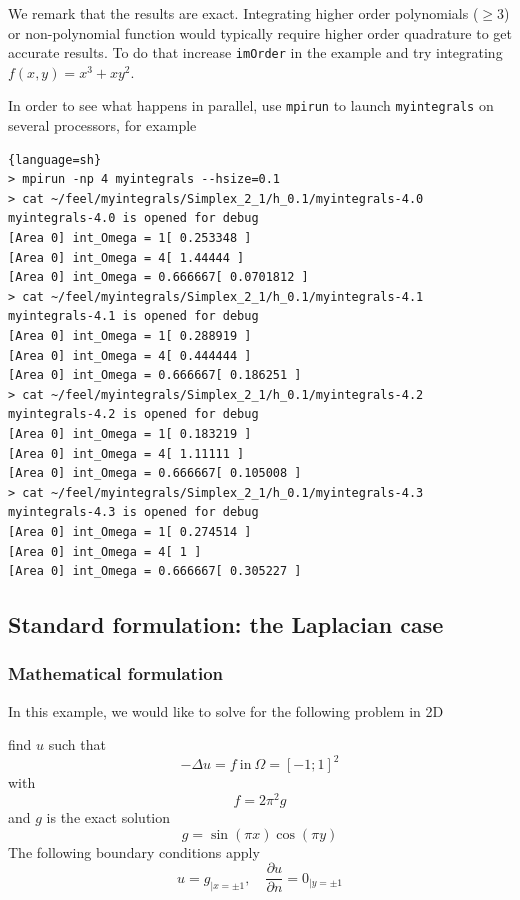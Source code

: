 We remark that the results are exact. Integrating higher order
polynomials ($\geq 3$) or non-polynomial function would typically
require higher order quadrature to get accurate results. To do that
increase \lstinline!imOrder! in the example and try integrating
$f(x,y)=x^3 + x y^2$.


In order to see what happens in parallel, use \lstinline!mpirun! to
launch \lstinline!myintegrals! on several processors, for example

\begin{lstlisting}{language=sh}
> mpirun -np 4 myintegrals --hsize=0.1
> cat ~/feel/myintegrals/Simplex_2_1/h_0.1/myintegrals-4.0
myintegrals-4.0 is opened for debug
[Area 0] int_Omega = 1[ 0.253348 ]
[Area 0] int_Omega = 4[ 1.44444 ]
[Area 0] int_Omega = 0.666667[ 0.0701812 ]
> cat ~/feel/myintegrals/Simplex_2_1/h_0.1/myintegrals-4.1
myintegrals-4.1 is opened for debug
[Area 0] int_Omega = 1[ 0.288919 ]
[Area 0] int_Omega = 4[ 0.444444 ]
[Area 0] int_Omega = 0.666667[ 0.186251 ]
> cat ~/feel/myintegrals/Simplex_2_1/h_0.1/myintegrals-4.2
myintegrals-4.2 is opened for debug
[Area 0] int_Omega = 1[ 0.183219 ]
[Area 0] int_Omega = 4[ 1.11111 ]
[Area 0] int_Omega = 0.666667[ 0.105008 ]
> cat ~/feel/myintegrals/Simplex_2_1/h_0.1/myintegrals-4.3
myintegrals-4.3 is opened for debug
[Area 0] int_Omega = 1[ 0.274514 ]
[Area 0] int_Omega = 4[ 1 ]
[Area 0] int_Omega = 0.666667[ 0.305227 ]
\end{lstlisting}

\subsection{Standard formulation: the Laplacian case}
\label{sec:defin-bilin-forms}
\subsubsection{Mathematical formulation}
\label{sec:math-form-3}
In this example, we would like to solve for the following problem in 2D
\begin{problem}
\label{prob:1}
 find $u$ such that
\begin{equation}
  \label{eq:1}
  -\Delta u = f\ \text{in}\ \Omega = [-1;1]^2
\end{equation}
with
\begin{equation}
  \label{eq:2}
  f= 2 \pi^2  g
\end{equation}
and $g$ is the exact solution
\begin{equation}
  \label{eq:3}
  g=\sin(\pi x) \cos(\pi y)
\end{equation}
The following boundary conditions apply
\begin{equation}
  \label{eq:4}
  u=g_{|x=\pm 1}, \quad \frac{\partial u}{\partial n} = 0_{|y=\pm 1}
\end{equation}
\end{problem}

